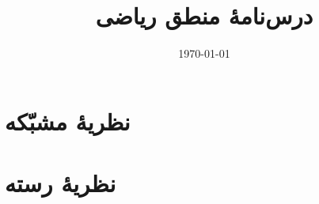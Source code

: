 \documentclass[12pt]{book}
\begin{document}
\title{درس‌نامهٔ منطق ریاضی}
\author{}
\date{\today}

\maketitle

\part{نظریهٔ مشبّکه}

\part{نظریهٔ رسته}
\end{document}
